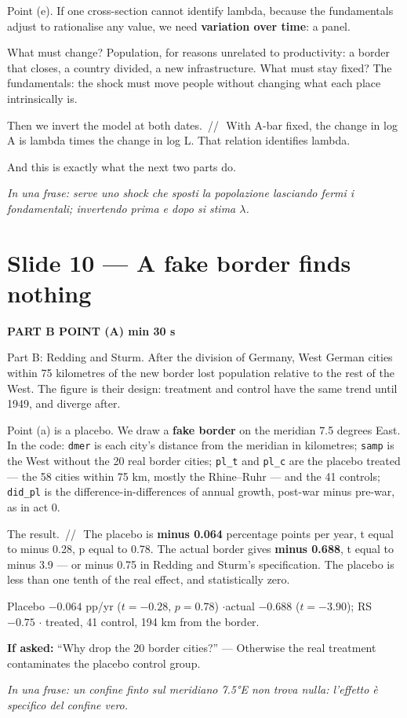 \documentclass[11pt,a4paper]{article}
\newcommand{\slide}[3]{\Needspace{14\baselineskip}\section{#1}\textcolor{unicared}{\small\bfseries\MakeUppercase{#3}\quad\textperiodcentered\quad #2}\par}
\newcommand{\idea}[1]{\par{\small\itshape\color{unicablue}In una frase: #1}\par}
\newcommand{\pause}{\textcolor{unicared}{\,/\!/\,}}
\begin{document}
\begin{say}
Point (e). If one cross-section cannot identify lambda, because the fundamentals adjust to rationalise any value, we need \textbf{variation over time}: a panel.

What must change? Population, for reasons unrelated to productivity: a border that closes, a country divided, a new infrastructure. What must stay fixed? The fundamentals: the shock must move people without changing what each place intrinsically is.

Then we invert the model at both dates. \pause\ With A-bar fixed, the change in log A is lambda times the change in log L. That relation identifies lambda.

And this is exactly what the next two parts do.
\end{say}

\idea{serve uno shock che sposti la popolazione lasciando fermi i fondamentali; invertendo prima e dopo si stima $\lambda$.}

\slide{Slide 10 --- A fake border finds nothing}{1 min 30 s}{Part B \textperiodcentered{} point (a)}

\begin{say}
Part B: Redding and Sturm. After the division of Germany, West German cities within 75 kilometres of the new border lost population relative to the rest of the West. The figure is their design: treatment and control have the same trend until 1949, and diverge after.

Point (a) is a placebo. We draw a \textbf{fake border} on the meridian 7.5 degrees East. In the code: \texttt{dmer} is each city's distance from the meridian in kilometres; \texttt{samp} is the West without the 20 real border cities; \texttt{pl\_t} and \texttt{pl\_c} are the placebo treated --- the 58 cities within 75 km, mostly the Rhine--Ruhr --- and the 41 controls; \texttt{did\_pl} is the difference-in-differences of annual growth, post-war minus pre-war, as in act 0.

The result. \pause\ The placebo is \textbf{minus 0.064} percentage points per year, t equal to minus 0.28, p equal to 0.78. The actual border gives \textbf{minus 0.688}, t equal to minus 3.9 --- or minus 0.75 in Redding and Sturm's specification. The placebo is less than one tenth of the real effect, and statistically zero.
\end{say}

\begin{nums}
Placebo $-0.064$ pp/yr ($t=-0.28$, $p=0.78$) \quad$\cdot$\quad actual $-0.688$ ($t=-3.90$); RS $-0.75$ \quad$\cdot$ treated, 41 control, 194 km from the border.
\end{nums}
\begin{ask}
\textbf{If asked:} ``Why drop the 20 border cities?'' --- Otherwise the real treatment contaminates the placebo control group.
\end{ask}
\idea{un confine finto sul meridiano 7.5°E non trova nulla: l'effetto è specifico del confine vero.}
\end{document}

